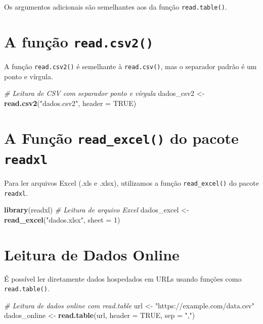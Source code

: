 \documentclass[
]{book}
\newenvironment{Shaded}{\begin{snugshade}}{\end{snugshade}}
\newcommand{\AttributeTok}[1]{\textcolor[rgb]{0.13,0.29,0.53}{#1}}
\newcommand{\CommentTok}[1]{\textcolor[rgb]{0.56,0.35,0.01}{\textit{#1}}}
\newcommand{\ConstantTok}[1]{\textcolor[rgb]{0.56,0.35,0.01}{#1}}
\newcommand{\DecValTok}[1]{\textcolor[rgb]{0.00,0.00,0.81}{#1}}
\newcommand{\FunctionTok}[1]{\textcolor[rgb]{0.13,0.29,0.53}{\textbf{#1}}}
\newcommand{\NormalTok}[1]{#1}
\newcommand{\OtherTok}[1]{\textcolor[rgb]{0.56,0.35,0.01}{#1}}
\newcommand{\StringTok}[1]{\textcolor[rgb]{0.31,0.60,0.02}{#1}}
\begin{document}
Os argumentos adicionais são semelhantes aos da função \texttt{read.table()}.

\section{\texorpdfstring{A função \texttt{read.csv2()}}{A função read.csv2()}}\label{a-funuxe7uxe3o-read.csv2}

A função \texttt{read.csv2()} é semelhante à \texttt{read.csv()}, mas o separador padrão é um ponto e vírgula.

\begin{Shaded}
\begin{Highlighting}[]
\CommentTok{\# Leitura de CSV com separador ponto e vírgula}
\NormalTok{dados\_csv2 }\OtherTok{\textless{}{-}} \FunctionTok{read.csv2}\NormalTok{(}\StringTok{"dados.csv2"}\NormalTok{, }\AttributeTok{header =} \ConstantTok{TRUE}\NormalTok{)}
\end{Highlighting}
\end{Shaded}

\section{\texorpdfstring{A Função \texttt{read\_excel()} do pacote \texttt{readxl}}{A Função read\_excel() do pacote readxl}}\label{a-funuxe7uxe3o-read_excel-do-pacote-readxl}

Para ler arquivos Excel (.xls e .xlsx), utilizamos a função \texttt{read\_excel()} do pacote \texttt{readxl}.

\begin{Shaded}
\begin{Highlighting}[]
\FunctionTok{library}\NormalTok{(readxl)}
\CommentTok{\# Leitura de arquivo Excel}
\NormalTok{dados\_excel }\OtherTok{\textless{}{-}} \FunctionTok{read\_excel}\NormalTok{(}\StringTok{"dados.xlsx"}\NormalTok{, }\AttributeTok{sheet =} \DecValTok{1}\NormalTok{)}
\end{Highlighting}
\end{Shaded}

\section{Leitura de Dados Online}\label{leitura-de-dados-online}

É possível ler diretamente dados hospedados em URLs usando funções como \texttt{read.table()}.

\begin{Shaded}
\begin{Highlighting}[]
\CommentTok{\# Leitura de dados online com read.table}
\NormalTok{url }\OtherTok{\textless{}{-}} \StringTok{"https://example.com/data.csv"}
\NormalTok{dados\_online }\OtherTok{\textless{}{-}} \FunctionTok{read.table}\NormalTok{(url, }\AttributeTok{header =} \ConstantTok{TRUE}\NormalTok{, }\AttributeTok{sep =} \StringTok{","}\NormalTok{)}
\end{Highlighting}
\end{Shaded}
\end{document}
